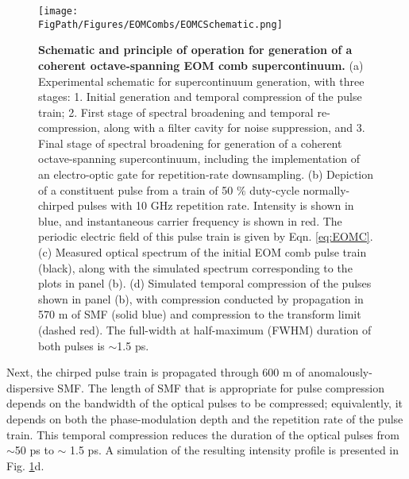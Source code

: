 \begin{figure}[htpb]
	\begin{center}
		\texttt{[image: \\FigPath/Figures/EOMCombs/EOMCSchematic.png]}
	\end{center}
	\caption[Schematic and principle of operation for generation of a coherent octave-spanning EOM comb supercontinuum]{\textbf{Schematic and principle of operation for generation of a coherent octave-spanning EOM comb supercontinuum.} (a) Experimental schematic for supercontinuum generation, with three stages: 1. Initial generation and temporal compression of the pulse train; 2. First stage of spectral broadening and temporal re-compression, along with a filter cavity for noise suppression, and 3. Final stage of spectral broadening for generation of a coherent octave-spanning supercontinuum, including the implementation of an electro-optic gate for repetition-rate downsampling. (b) Depiction of a constituent pulse from a train of 50 $\%$ duty-cycle normally-chirped pulses with 10 GHz repetition rate. Intensity is shown in blue, and instantaneous carrier frequency is shown in red. The periodic electric field of this pulse train is given by Eqn. \ref{eq:EOMC}. (c) Measured optical spectrum of the initial EOM comb pulse train (black), along with the simulated spectrum corresponding to the plots in panel (b). (d) Simulated temporal compression of the pulses shown in panel (b), with compression conducted by propagation in 570 m of SMF (solid blue) and compression to the transform limit (dashed red). The full-width at half-maximum (FWHM) duration of both pulses is $\sim$1.5 ps.   }
	\label{fig:EOMC_Schematic}
\end{figure} 


Next, the chirped pulse train is propagated through 600 m of anomalously-dispersive SMF. The length of SMF that is appropriate for pulse compression depends on the bandwidth of the optical pulses to be compressed; equivalently, it depends on both the phase-modulation depth and the repetition rate of the pulse train. This temporal compression reduces the duration of the optical pulses from $\sim$50 ps to $\sim$ 1.5 ps. A simulation of the resulting intensity profile is presented in Fig. \ref{fig:EOMC_Schematic}d. 

